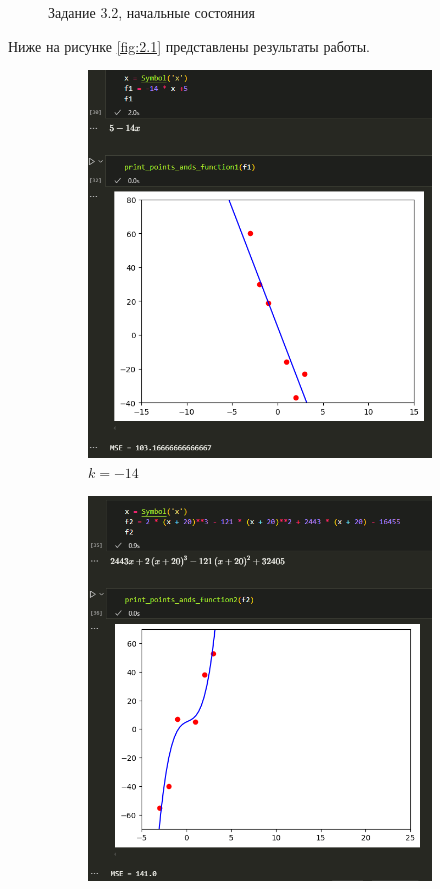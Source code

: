 \documentclass[14pt,a4paper]{extarticle}
\begin{document}
\begin{figure}[h!]
    \caption{Задание 3.2, начальные состояния}
    \label{fig:2.1-start}
\end{figure}

Ниже на рисунке \ref{fig:2.1} представлены результаты работы.

\begin{figure}[h!]
    \begin{subfigure}{.5\textwidth}
        \centering
        \includegraphics[width=0.9\linewidth]{figures/3.2-1.png}
        \caption{$k=-14$}
        \label{fig:3.2-1}
    \end{subfigure}%
    \begin{subfigure}{.5\textwidth}
        \centering
        \includegraphics[width=0.9\linewidth]{figures/3.2-2.png}

\end{subfigure}
\end{figure}
\end{document}
